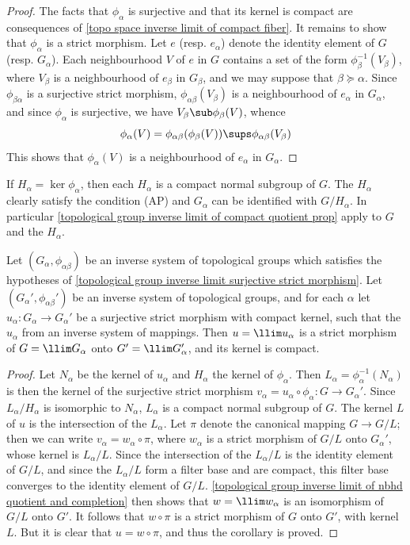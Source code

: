 \begin{proof}
The facts that $\phi_\alpha$ is surjective and that its kernel is compact are consequences of \cref{topo space inverse limit of compact fiber}. It remains to show that $\phi_\alpha$ is a strict morphism. Let $e$ (resp. $e_\alpha$) denote the identity element of $G$ (resp. $G_\alpha$). Each neighbourhood $V$ of $e$ in $G$ contains a set of the form $\phi_\beta^{-1}(V_\beta)$, where $V_\beta$ is a neighbourhood of $e_\beta$ in $G_\beta$, and we may suppose that $\beta\succeq\alpha$. Since $\phi_{\beta\alpha}$ is a surjective strict morphism, $\phi_{\alpha\beta}(V_\beta)$ is a neighbourhood of $e_\alpha$ in $G_\alpha$, and since $\phi_\alpha$ is surjective, we have $V_\beta\sub\phi_\beta(V)$, whence
\[\phi_\alpha(V)=\phi_{\alpha\beta}(\phi_\beta(V))\sups\phi_{\alpha\beta}(V_\beta)\]
This shows that $\phi_\alpha(V)$ is a neighbourhood of $e_\alpha$ in $G_\alpha$.
\end{proof}
If $H_\alpha=\ker\phi_\alpha$, then each $H_\alpha$ is a compact normal subgroup of $G$. The $H_\alpha$ clearly satisfy the condition (AP) and $G_\alpha$ can be identified with $G/H_\alpha$. In particular \cref{topological group inverse limit of compact quotient prop} apply to $G$ and the $H_\alpha$.
\begin{corollary}\label{topological group inverse limit of surjective strict morphisms}
Let $(G_\alpha,\phi_{\alpha\beta})$ be an inverse system of topological groups which satisfies the hypotheses of \cref{topological group inverse limit surjective strict morphism}. Let $(G_\alpha',\phi_{\alpha\beta}')$ be an inverse system of topological groups, and for each $\alpha$ let $u_\alpha:G_\alpha\to G_\alpha'$ be a surjective strict morphism with compact kernel, such that the $u_\alpha$ from an inverse system of mappings. Then $u=\llim u_\alpha$ is a strict morphism of $G=\llim G_\alpha$ onto $G'=\llim G_\alpha'$, and its kernel is compact.
\end{corollary}
\begin{proof}
Let $N_\alpha$ be the kernel of $u_\alpha$ and $H_\alpha$ the kernel of $\phi_\alpha$. Then $L_\alpha=\phi_\alpha^{-1}(N_\alpha)$ is then the kernel of the surjective strict morphism $v_\alpha=u_\alpha\circ\phi_\alpha:G\to G_\alpha'$. Since $L_\alpha/H_\alpha$ is isomorphic to $N_\alpha$, $L_\alpha$ is a compact normal subgroup of $G$. The kernel $L$ of $u$ is the intersection of the $L_\alpha$. Let $\pi$ denote the canonical mapping $G\to G/L$; then we can write $v_\alpha=w_\alpha\circ\pi$, where $w_\alpha$ is a strict morphism of $G/L$ onto $G_\alpha'$, whose kernel is $L_\alpha/L$. Since the intersection of the $L_\alpha/L$ is the identity element of $G/L$, and since the $L_\alpha/L$ form a filter base and are compact, this filter base converges to the identity element of $G/L$. \cref{topological group inverse limit of nbhd quotient and completion} then shows that $w=\llim w_\alpha$ is an isomorphism of $G/L$ onto $G'$. It follows that $w\circ\pi$ is a strict morphism of $G$ onto $G'$, with kernel $L$. But it is clear that $u=w\circ\pi$, and thus the corollary is proved.
\end{proof}